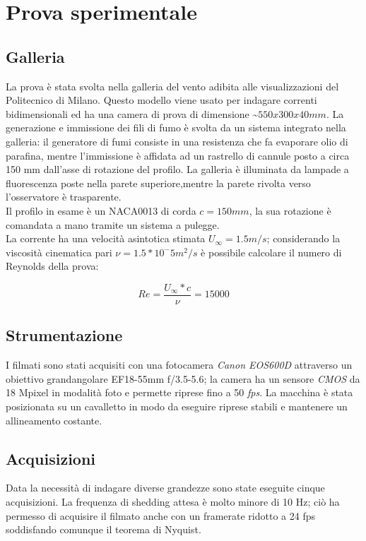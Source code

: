 \chapter{Prova sperimentale}
\section{Galleria}
La prova è stata svolta nella galleria del vento adibita alle visualizzazioni del Politecnico di Milano. Questo modello viene usato per indagare correnti bidimensionali ed ha una camera di prova di dimensione \textasciitilde $550x300x40 mm$.
La generazione e immissione dei fili di fumo è svolta da un sistema integrato nella galleria: il generatore di fumi consiste in una resistenza che fa evaporare olio di parafina, mentre l'immissione è affidata ad un rastrello di cannule posto a circa 150 mm dall'asse di rotazione del profilo. La galleria è illuminata da lampade a fluorescenza poste nella parete superiore,mentre la parete rivolta verso l'osservatore è trasparente. \\
Il profilo in esame è un NACA0013 di corda $c = 150 mm$, la sua rotazione è comandata a mano tramite un sistema a pulegge. \\
La corrente ha una velocità asintotica stimata $U_{\infty} = 1.5 m/s$; considerando la viscosità cinematica pari  $\nu = 1.5*10^-5 m^2/s$ è possibile calcolare il numero di Reynolds della prova:

\begin{center}
\begin{equation}
Re = \frac{U_{\infty} * c}{\nu} = 15000
\end{equation}
\end{center} 

\section{Strumentazione}
I filmati sono stati acquisiti con una fotocamera \emph{Canon EOS600D} attraverso un obiettivo grandangolare EF18-55mm f/3.5-5.6; la camera ha un sensore \emph{CMOS} da 18 Mpixel in modalità foto e permette riprese fino a 50 \emph{fps}. La macchina è stata posizionata su un cavalletto in modo da eseguire riprese stabili e mantenere un allineamento costante.

\section{Acquisizioni}
Data la necessità di indagare diverse grandezze sono state eseguite cinque acquisizioni. La frequenza di shedding attesa è molto minore di 10 Hz; ciò ha permesso di acquisire il filmato anche con un framerate ridotto a 24 fps soddisfando comunque il teorema di Nyquist. 

